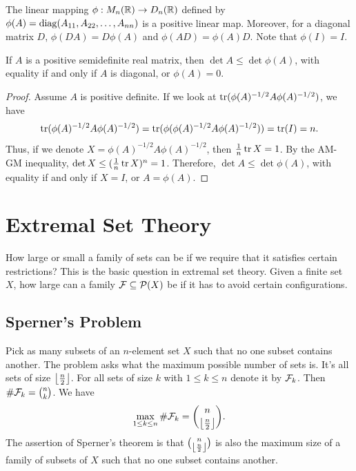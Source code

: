 The linear mapping $\phi:M_{n}(\mathbb{R}) \to D_{n}(\mathbb{R})$ defined by $\phi(A) = \operatorname{diag}(A_{11},A_{22},\ldots,A_{nn})$ is a positive linear map. Moreover, for a diagonal matrix $D$, $\phi(DA) = D\phi(A)$ and $\phi(AD) = \phi(A)D$. Note that $\phi(I) = I$.

\begin{theorem}
    If $A$ is a positive semidefinite real matrix, then $\det A \leq \det \phi(A)$, with equality if and only if $A$ is diagonal, or $\phi(A) = 0$.
\end{theorem}
\begin{proof}
    Assume $A$ is positive definite. If we look at $\operatorname{tr} (\phi(A)^{-1/2} A \phi(A)^{-1/2})$, we have
    \begin{align}
        \operatorname{tr} ( \phi(A)^{-1/2} A \phi(A)^{-1/2}) = \operatorname{tr} (\phi(\phi(A)^{-1/2} A \phi(A)^{-1/2})) = \operatorname{tr} (I) = n.
    \end{align}
    Thus, if we denote $X = \phi(A)^{-1/2} A \phi(A)^{-1/2}$, then $\frac{1}{n} \operatorname{tr} X = 1$. By the AM-GM inequality, $\det X \leq (\frac{1}{n} \operatorname{tr} X)^{n} = 1$. Therefore, $\det A \leq \det \phi(A)$, with equality if and only if $X = I$, or $A = \phi(A)$.
\end{proof}


\section{Extremal Set Theory}

How large or small a family of sets can be if we require that it satisfies certain restrictions? This is the basic question in extremal set theory. Given a finite set $X$, how large can a family $\mathcal{F} \subseteq \mathcal{P}(X)$ be if it has to avoid certain configurations.

\subsection{Sperner's Problem}
Pick as many subsets of an $n$-element set $X$ such that no one subset contains another. The problem asks what the maximum possible number of sets is. It's all sets of size $\left\lfloor \frac{n}{2} \right\rfloor$. For all sets of size $k$ with $1 \leq k \leq n$ denote it by $\mathcal{F}_{k}$. Then $\# \mathcal{F}_{k} = \binom{n}{k}$. We have
\begin{align}
    \max_{1 \leq k \leq n} \# \mathcal{F}_{k} = \binom{n}{\left\lfloor \frac{n}{2} \right\rfloor}.
\end{align}
The assertion of Sperner's theorem is that $\binom{n}{\left\lfloor \frac{n}{2} \right\rfloor}$ is also the maximum size of a family of subsets of $X$ such that no one subset contains another.

